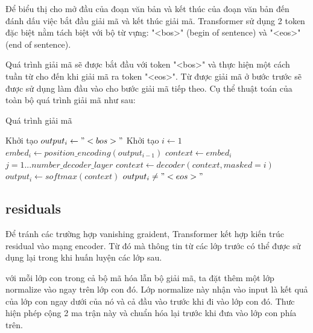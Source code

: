 Để biểu thị cho mở đầu của đoạn văn bản và kết thúc của đoạn văn bản đến đánh dấu việc bắt đầu giải mã và kết thúc giải mã. Transformer sử dụng 2 token đặc biệt nằm tách biệt với bộ từ vựng: "<bos>" (begin of sentence) và "<eos>" (end of sentence).

Quá trình giải mã sẽ được bắt đầu với token "<bos>" và thực hiện một cách tuần từ cho đến khi giải mã ra token "<eos>". Từ được giải mã ở bước trước sẽ được sử dụng làm đầu vào cho bước giải mã tiếp theo. Cụ thể thuật toán của toàn bộ quá trình giải mã như sau:

\begin{algorithm}[H]
    \caption{Quá trình giải mã}
    \begin{algorithmic}[1]
		\State Khởi tạo $output_i \gets "<bos>"$
		\State Khởi tạo $i \gets 1$
		\Do
			\State $embed_i \gets position\_encoding(output_{i-1})$
			\State $context \gets embed_i$
			\For $j = 1...number\_decoder\_layer$
				\State $context \gets decoder(context, masked = i)$
			\EndFor
			\State $output_i \gets softmax(context)$
		\doWhile $output_i \neq "<eos>"$
    \end{algorithmic}
\end{algorithm}


\subsection{residuals}
Để tránh các trường hợp vanishing graident, Transformer kết hợp kiến trúc residual vào mạng encoder. Từ đó mà thông tin từ các lớp trước có thể được sử dụng lại trong khi huấn luyện các lớp sau.

với mỗi lớp con trong cả bộ mã hóa lẫn bộ giải mã, ta đặt thêm một lớp normalize vào ngay trên lớp con đó. Lớp normalize này nhận vào input là kết quả của lớp con ngay dưới của nó và cả đầu vào trước khi đi vào lớp con đó. Thưc hiện phép cộng 2 ma trận này và chuẩn hóa lại trước khi đưa vào lớp con phía trên.

